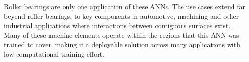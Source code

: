 Roller bearings are only one application of these ANNs. The use cases extend far beyond roller bearings, to key components in automotive, machining and other industrial applications where interactions between contiguous surfaces exist. Many of these machine elements operate within the regions that this ANN was trained to cover, making it a deployable solution across many applications with low computational training effort.



